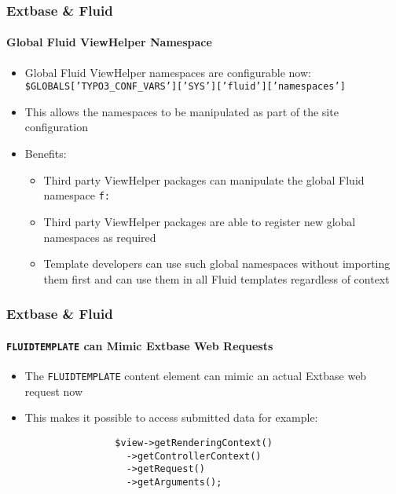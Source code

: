 \begin{frame}[fragile]
	\frametitle{Extbase \& Fluid}
	\framesubtitle{Global Fluid ViewHelper Namespace}

	\begin{itemize}
		\item Global Fluid ViewHelper namespaces are configurable now:\newline
			\smaller
				\texttt{\$GLOBALS['TYPO3\_CONF\_VARS']['SYS']['fluid']['namespaces']}
			\normalsize
		\item This allows the namespaces to be manipulated as part of the site configuration
		\item Benefits:

			\begin{itemize}
				\item Third party ViewHelper packages can manipulate the global Fluid namespace \texttt{f:}
				\item Third party ViewHelper packages are able to register new global namespaces as required
				\item Template developers can use such global namespaces without importing them first
					and can use them in all Fluid templates regardless of context
			\end{itemize}

	\end{itemize}

\end{frame}


\begin{frame}[fragile]
	\frametitle{Extbase \& Fluid}
	\framesubtitle{\texttt{FLUIDTEMPLATE} can Mimic Extbase Web Requests}

	\lstset{basicstyle=\small\ttfamily}

	\begin{itemize}
		\item The \texttt{FLUIDTEMPLATE} content element can mimic an actual Extbase web request now
		\item This makes it possible to access submitted data for example:

			\begin{lstlisting}
				$view->getRenderingContext()
				  ->getControllerContext()
				  ->getRequest()
				  ->getArguments();
			\end{lstlisting}

	\end{itemize}

\end{frame}




